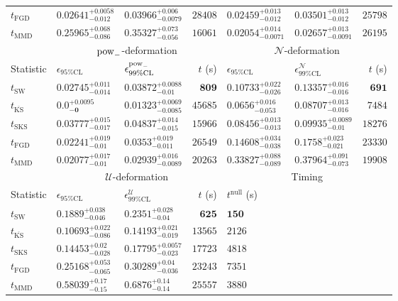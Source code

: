 \begin{tabular}{l|llr|llr}
	$t_{\mathrm{FGD}}$ & ${\mathbf{0.02641_{-0.012}^{+0.0058}}}$ & ${\mathbf{0.03966_{-0.0079}^{+0.006}}}$ & $28408$ & $0.02459_{-0.012}^{+0.013}$ & $0.03501_{-0.012}^{+0.013}$ & $25798$ \\
	$t_{\mathrm{MMD}}$ & $0.25965_{-0.086}^{+0.068}$ & $0.35327_{-0.056}^{+0.073}$ & $16061$ & $0.02054_{-0.0071}^{+0.014}$ & $0.02657_{-0.0091}^{+0.013}$ & $26195$ \\
	\toprule
	\multicolumn{1}{c}{} & \multicolumn{3}{c}{$\rm{pow}_{-}$-deformation} & \multicolumn{3}{c}{$\mathcal{N}$-deformation} \\
	Statistic & $\epsilon_{95\%\mathrm{CL}}$ & $\epsilon^  {\rm{pow}_{-}}_{99\%\mathrm{CL}}$ & $t$ (s) & $\epsilon_{95\%\mathrm{CL}}$ & $\epsilon^    {\mathcal{N}}_{99\%\mathrm{CL}}$ & $t$ (s) \\
	\midrule
	$t_{\mathrm{SW}}$ & $0.02745_{-0.014}^{+0.011}$ & $0.03872_{-0.01}^{+0.0088}$ & ${\mathbf{809}}$ & $0.10733_{-0.026}^{+0.022}$ & $0.13357_{-0.016}^{+0.016}$ & ${\mathbf{691}}$ \\
	$t_{\overline{\mathrm{KS}}}$ & ${\mathbf{0.0_{-0}^{+0.0095}}}$ & ${\mathbf{0.01323_{-0.0085}^{+0.0069}}}$ & $45685$ & ${\mathbf{0.0656_{-0.053}^{+0.016}}}$ & ${\mathbf{0.08707_{-0.016}^{+0.013}}}$ & $7484$ \\
	$t_{\mathrm{SKS}}$ & $0.03777_{-0.017}^{+0.015}$ & $0.04837_{-0.015}^{+0.014}$ & $15966$ & $0.08456_{-0.013}^{+0.013}$ & $0.09935_{-0.01}^{+0.0089}$ & $18276$ \\
	$t_{\mathrm{FGD}}$ & $0.02241_{-0.01}^{+0.019}$ & $0.0353_{-0.011}^{+0.019}$ & $26549$ & $0.14608_{-0.038}^{+0.034}$ & $0.1758_{-0.021}^{+0.023}$ & $23330$ \\
	$t_{\mathrm{MMD}}$ & $0.02077_{-0.01}^{+0.017}$ & $0.02939_{-0.0089}^{+0.016}$ & $20263$ & $0.33827_{-0.089}^{+0.088}$ & $0.37964_{-0.073}^{+0.091}$ & $19908$ \\
	\toprule
	\multicolumn{1}{c}{} & \multicolumn{3}{c}{$\mathcal{U}$-deformation} & \multicolumn{3}{c}{Timing} \\
	Statistic & $\epsilon_{95\%\mathrm{CL}}$ & $\epsilon^    {\mathcal{U}}_{99\%\mathrm{CL}}$ & $t$ (s) & $t^{\mathrm{null}}$ (s) \\
	\midrule
	$t_{\mathrm{SW}}$ & $0.1889_{-0.046}^{+0.038}$ & $0.2351_{-0.04}^{+0.028}$ & ${\mathbf{625}}$ & ${\mathbf{150}}$ \\
	$t_{\overline{\mathrm{KS}}}$ & ${\mathbf{0.10693_{-0.086}^{+0.022}}}$ & ${\mathbf{0.14193_{-0.019}^{+0.021}}}$ & $13565$ & $2126$ \\
	$t_{\mathrm{SKS}}$ & $0.14453_{-0.028}^{+0.02}$ & $0.17795_{-0.023}^{+0.0057}$ & $17723$ & $4818$ \\
	$t_{\mathrm{FGD}}$ & $0.25168_{-0.065}^{+0.053}$ & $0.30289_{-0.036}^{+0.04}$ & $23243$ & $7351$ \\
	$t_{\mathrm{MMD}}$ & $0.58039_{-0.15}^{+0.17}$ & $0.6876_{-0.14}^{+0.14}$ & $25557$ & $3880$ \\
	\bottomrule
\end{tabular}